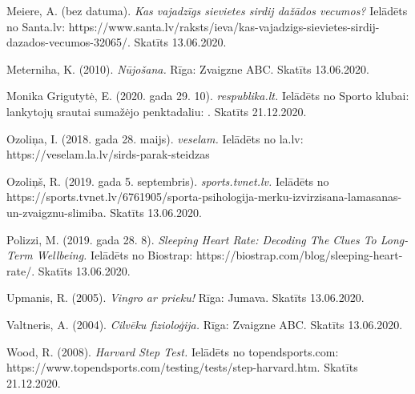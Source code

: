 \documentclass[12pt]{article}
\begin{document}
\begin{thebibliography}{9}
Meiere, A. (bez datuma). \textit{Kas vajadzīgs sievietes sirdij dažādos vecumos?} Ielādēts no Santa.lv: https://www.santa.lv/raksts/ieva/kas-vajadzigs-sievietes-sirdij-dazados-vecumos-32065/. Skatīts 13.06.2020.

Meterniha, K. (2010). \textit{Nūjošana.} Rīga: Zvaigzne ABC. Skatīts 13.06.2020.

Monika Grigutytė, E. (2020. gada 29. 10). \textit{respublika.lt.} Ielādēts no Sporto klubai: lankytojų srautai sumažėjo penktadaliu: . Skatīts 21.12.2020.

Ozoliņa, I. (2018. gada 28. maijs). \textit{veselam.} Ielādēts no la.lv: https://veselam.la.lv/sirds-parak-steidzas

Ozoliņš, R. (2019. gada 5. septembris). \textit{sports.tvnet.lv.} Ielādēts no https://sports.tvnet.lv/6761905/sporta-psihologija-merku-izvirzisana-lamasanas-un-zvaigznu-slimiba. Skatīts 13.06.2020.

Polizzi, M. (2019. gada 28. 8). \textit{Sleeping Heart Rate: Decoding The Clues To Long-Term Wellbeing.} Ielādēts no Biostrap: https://biostrap.com/blog/sleeping-heart-rate/. Skatīts 13.06.2020.

Upmanis, R. (2005). \textit{Vingro ar prieku!} Rīga: Jumava. Skatīts 13.06.2020.

Valtneris, A. (2004). \textit{Cilvēku fizioloģija.} Rīga: Zvaigzne ABC. Skatīts 13.06.2020.

Wood, R. (2008). \textit{Harvard Step Test.} Ielādēts no topendsports.com: https://www.topendsports.com/testing/tests/step-harvard.htm. Skatīts 21.12.2020.
\end{thebibliography} 
\end{document}
